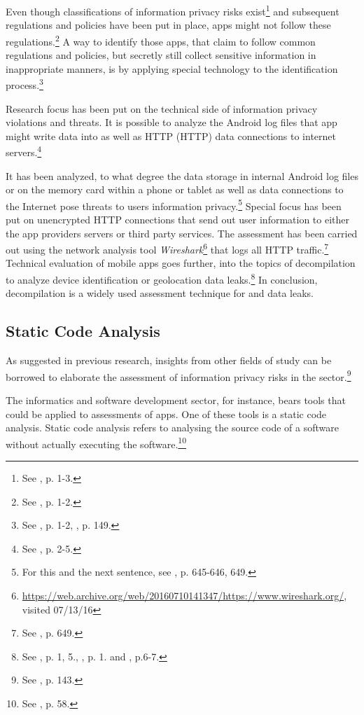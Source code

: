 Even though classifications of information privacy risks exist\footnote{See \cite{Lewis2014}, p. 1-3.} and subsequent regulations and policies have been put in place, \mH apps might not follow these regulations.\footnote{See \cite{Huckvale2015}, p. 1-2.}
A way to identify those apps, that claim to follow common regulations and policies, but secretly still collect sensitive information in inappropriate manners, is by applying special technology to the identification process.\footnote{See \cite{Huckvale2015}, p. 1-2, \cite{Arora2014}, p. 149.}

Research focus has been put on the technical side of information privacy violations and threats. 
It is possible to analyze the Android log files that \mH app might write data into as well as \acl{HTTP} (\acs{HTTP}) data connections to internet servers.\footnote{See \cite{Huckvale2015}, p. 2-5.}

It has been analyzed, to what degree the data storage in internal Android log files or on the memory card within a phone or tablet as well as data connections to the Internet pose threats to users information privacy.\footnote{For this and the next sentence, see \cite{He2014}, p. 645-646, 649.}
Special focus has been put on unencrypted HTTP connections that send out user information to either the app providers servers or third party services.
The assessment has been carried out using the network analysis tool \textit{Wireshark}\footnote{\url{https://web.archive.org/web/20160710141347/https://www.wireshark.org/}, visited 07/13/16} that logs all HTTP traffic.\footnote{See \cite{He2014}, p. 649.}
Technical evaluation of mobile apps goes further, into the topics of decompilation to analyze device identification or geolocation data leaks.\footnote{See \cite{Mcclurg2012}, p. 1, 5., \cite{Enck2011}, p. 1. and \cite{Mitchell2013}, p.6-7.}
In conclusion, decompilation is a widely used assessment technique for \ipr and data leaks.

\subsection{Static Code Analysis}

As suggested in previous research, insights from other fields of study can be borrowed to elaborate the assessment of information privacy risks in the \mH sector.\footnote{See \cite{Arora2014}, p. 143.}

The informatics and software development sector, for instance, bears tools that could be applied to \ipr assessments of \mH apps.
One of these tools is a static code analysis.
Static code analysis refers to analysing the source code of a software without actually executing the software.\footnote{See \cite{Louridas2006}, p. 58.}

